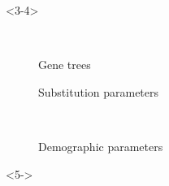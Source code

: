 \begin{frame}[t,label=fullmodel]
\begin{minipage}[t][0.45\textheight][t]{\linewidth}
        \begin{adjustwidth}{.11\textwidth}{0em}
        \hspace{0.5\textwidth}
            \begin{onlyenv}<3-4>
                \begin{description}
                    \item[\ ] Gene trees
                    \item[\allParameters{}] Substitution parameters
                    \item[\ ] Demographic parameters
                \end{description}
            \end{onlyenv}
        \end{adjustwidth}
        
        \vspace{-5mm}
        \begin{uncoverenv}<5->
            \begin{displaybox}[0.85\linewidth]

                \vspace{-7mm}


\end{displaybox}
\end{uncoverenv}
\end{minipage}
\end{frame}
